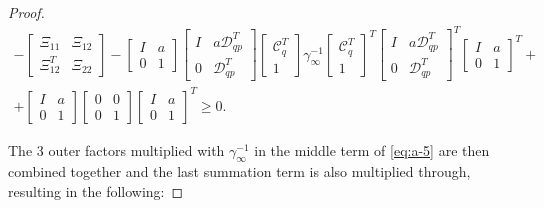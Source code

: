 \begin{proof}
	\begin{multline} \label{eq:a-5}
		-\begin{bmatrix}
			\Xi_{11} & \Xi_{12} \\
			\Xi_{12}^T & \Xi_{22}
		\end{bmatrix} -
		\begin{bmatrix}
			I & a \\
			0 & 1
		\end{bmatrix}
		\begin{bmatrix}
			I & a\mathcal{D}_{qp}^T \\
			0 & \mathcal{D}_{qp}^T
		\end{bmatrix}
		\begin{bmatrix}
			\mathcal{C}_q^T \\
			1
		\end{bmatrix}
		\gamma_\infty^{-1}
		\begin{bmatrix}
			\mathcal{C}_q^T \\
			1
		\end{bmatrix}^T
		\begin{bmatrix}
			I & a\mathcal{D}_{qp}^T \\
			0 & \mathcal{D}_{qp}^T
		\end{bmatrix}^T
		\begin{bmatrix} 
			I & a \\
			0 & 1
		\end{bmatrix}^T + \\
		+\begin{bmatrix}
			I & a \\
			0 & 1
		\end{bmatrix}
		\begin{bmatrix}
			0 & 0 \\
			0 & 1
		\end{bmatrix}
		\begin{bmatrix} 
			I & a \\
			0 & 1
		\end{bmatrix}^T
		\geq 0.
	\end{multline}
	
	The 3 outer factors multiplied with $\gamma_\infty^{-1}$ in the middle term of \autoref{eq:a-5} are then combined together and the last summation term is also multiplied through, resulting in the following:
	

\end{proof}
